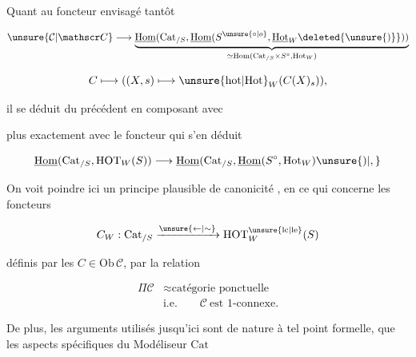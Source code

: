 
Quant au foncteur envisagé tantôt

\[
\unsure{\mathcal C|\mathscr C}\longrightarrow
\underbrace{\underline{\mathrm{Hom}}(\mathrm{Cat}_{/S},\underline{\mathrm{Hom}}(S^{\unsure{\circ|o}},\underline{\mathrm{Hot}}_W\deleted{\unsure{)}}))}_{\simeq\mathrm{Hom}(\mathrm{Cat}_{/S}\times S^\circ,\mathrm{Hot}_W)}
\]

\[
C\longmapsto ((X,s)\longmapsto\unsure{\mathrm{hot}|\mathrm{Hot}}_W(C(X)_s)),
\]

il se déduit du précédent en composant avec


plus exactement avec le foncteur qui s'en déduit

\[
\underline{\mathrm{Hom}}(\mathrm{Cat}_{/S},\mathrm{HOT}_W(S))\longrightarrow\underline{\mathrm{Hom}}(\mathrm{Cat}_{/S},\underline{\mathrm{Hom}}(S^\circ,\mathrm{Hot}_W)\unsure{)|,}
\]

On voit poindre ici un principe plausible de canonicité , en ce qui concerne les foncteurs

\[
C_W:\mathrm{Cat}_{/S}\xrightarrow{\unsure{\leftarrow|\sim}}\mathrm{HOT}^{\unsure{\mathrm{lc}|\mathrm{le}}}_W(S)
\]

définis par les $C\in\mathrm{Ob}\,\mathcal C$, par la relation

\[
\begin{aligned}
\Pi\mathcal C&\approx\text{catégorie ponctuelle}\\
&\text{i.e.}\qquad\mathcal C\ \text{est }1\text{-connexe}.
\end{aligned}
\]

De plus, les arguments utilisés jusqu'ici sont de nature à tel point formelle, que les aspects spécifiques du Modéliseur $\mathrm{Cat}$
